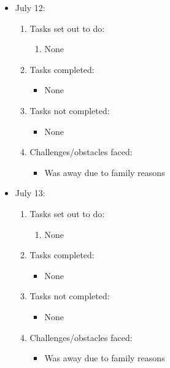 	\begin{itemize}
		\item July 12:
		\begin{enumerate}
			\item Tasks set out to do:
			\begin{enumerate}
				\item None
			\end{enumerate}
			\item Tasks completed:
			\begin{itemize}
				\item None
			\end{itemize}
			\item Tasks not completed:
			\begin{itemize}
				\item None
			\end{itemize}
			\item Challenges/obstacles faced:
			\begin{itemize}
				\item Was away due to family reasons
			\end{itemize}			
		\end{enumerate}
	\end{itemize}
	
	\begin{itemize}
		\item July 13:
		\begin{enumerate}
			\item Tasks set out to do:
			\begin{enumerate}
				\item None
			\end{enumerate}
			\item Tasks completed:
			\begin{itemize}
				\item None
			\end{itemize}
			\item Tasks not completed:
			\begin{itemize}
				\item None
			\end{itemize}
			\item Challenges/obstacles faced:
			\begin{itemize}
				\item Was away due to family reasons
			\end{itemize}			
		\end{enumerate}
	\end{itemize}
	
